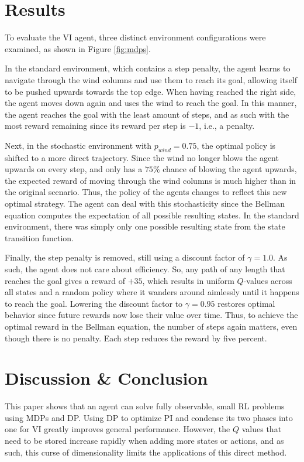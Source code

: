 \documentclass[sigconf,nonacm]{acmart}
\begin{document}
\section{Results}
To evaluate the VI agent, three distinct environment configurations were examined, as shown in Figure \ref{fig:mdps}. 

In the standard environment, which contains a step penalty, the agent learns to navigate through the wind columns and use them to reach its goal, allowing itself to be pushed upwards towards the top edge. When having reached the right side, the agent moves down again and uses the wind to reach the goal. In this manner, the agent reaches the goal with the least amount of steps, and as such with the most reward remaining since its reward per step is $-1$, i.e., a penalty.

Next, in the stochastic environment with $p_{wind}=0.75$, the optimal policy is shifted to a more direct trajectory. Since the wind no longer blows the agent upwards on every step, and only has a $75\%$ chance of blowing the agent upwards, the expected reward of moving through the wind columns is much higher than in the original scenario. Thus, the policy of the agents changes to reflect this new optimal strategy. The agent can deal with this stochasticity since the Bellman equation computes the expectation of all possible resulting states. In the standard environment, there was simply only one possible resulting state from the state transition function.

Finally, the step penalty is removed, still using a discount factor of $\gamma=1.0$. As such, the agent does not care about efficiency. So, any path of any length that reaches the goal gives a reward of $+35$, which results in uniform $Q$-values across all states and a random policy where it wanders around aimlessly until it happens to reach the goal. Lowering the discount factor to $\gamma=0.95$ restores optimal behavior since future rewards now lose their value over time. Thus, to achieve the optimal reward in the Bellman equation, the number of steps again matters, even though there is no penalty. Each step reduces the reward by five percent.

\section{Discussion \& Conclusion}

This paper shows that an agent can solve fully observable, small RL problems using MDPs and DP. Using DP to optimize PI and condense its two phases into one for VI greatly improves general performance. However, the $Q$ values that need to be stored increase rapidly when adding more states or actions, and as such, this curse of dimensionality limits the applications of this direct method.
\end{document}
